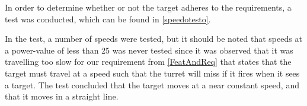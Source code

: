 In order to determine whether or not the target adheres to the requirements, a
test was conducted, which can be found in \autoref{speedotesto}. 

In the test, a number of speeds were tested, but it should be noted that speeds
at a power-value of less than 25 was never tested since it was observed that it
was travelling too slow for our requirement from \autoref{FeatAndReq} that
states that the target must travel at a speed such that the turret will miss if
it fires when it sees a target.\nl
The test concluded that the target moves at a near constant speed, and that it
moves in a straight line.
